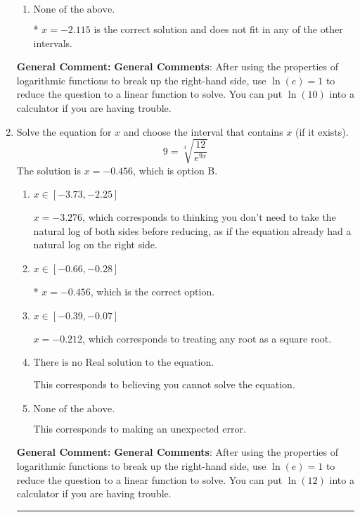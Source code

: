 \documentclass{extbook}[14pt]
\newcommand{\litem}[1]{\item #1

\rule{\textwidth}{0.4pt}}
\begin{document}
\begin{enumerate}
{\begin{enumerate}[label=\Alph*.]
This corresponds to believing you cannot solve the equation.
\item \( \text{None of the above.} \)

* $x = -2.115$ is the correct solution and does not fit in any of the other intervals.
\end{enumerate}

\textbf{General Comment:} \textbf{General Comments}: After using the properties of logarithmic functions to break up the right-hand side, use $\ln(e) = 1$ to reduce the question to a linear function to solve. You can put $\ln(10)$ into a calculator if you are having trouble.
}
\litem{
 Solve the equation for $x$ and choose the interval that contains $x$ (if it exists).
\[  9 = \sqrt[3]{\frac{12}{e^{9x}}} \]The solution is \( x = -0.456 \), which is option B.\begin{enumerate}[label=\Alph*.]
\item \( x \in [-3.73, -2.25] \)

$x = -3.276$, which corresponds to thinking you don't need to take the natural log of both sides before reducing, as if the equation already had a natural log on the right side.
\item \( x \in [-0.66, -0.28] \)

* $x = -0.456$, which is the correct option.
\item \( x \in [-0.39, -0.07] \)

$x = -0.212$, which corresponds to treating any root as a square root.
\item \( \text{There is no Real solution to the equation.} \)

This corresponds to believing you cannot solve the equation.
\item \( \text{None of the above.} \)

This corresponds to making an unexpected error.
\end{enumerate}

\textbf{General Comment:} \textbf{General Comments}: After using the properties of logarithmic functions to break up the right-hand side, use $\ln(e) = 1$ to reduce the question to a linear function to solve. You can put $\ln(12)$ into a calculator if you are having trouble.
}
\end{enumerate}
\end{document}
